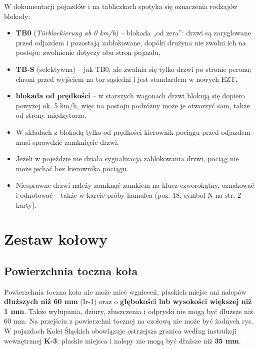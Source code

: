 W dokumentacji pojazdów i na tabliczkach spotyka się oznaczenia rodzajów blokady:
\begin{itemize}
	\item \textbf{TB0} (\textit{Türblockierung ab 0 km/h}) – blokada „od zera”: drzwi są zaryglowane przed odjazdem i pozostają zablokowane, dopóki drużyna nie zwolni ich na postoju; zwolnienie dotyczy obu stron pojazdu,
	\item \textbf{TB-S} (selektywna) – jak TB0, ale zwalnia się tylko drzwi po stronie peronu; chroni przed wyjściem na tor sąsiedni i jest standardem w nowych EZT,
	\item \textbf{blokada od prędkości} – w starszych wagonach drzwi blokują się dopiero powyżej ok. 5 km/h, więc na postoju podróżny może je otworzyć sam, także od strony międzytorza.
\end{itemize}

\begin{tcolorbox}[colback=yellow!10!white,colframe=orange!80!black,title=Dla kierownika pociągu]
	\begin{itemize}
		\item W składach z blokadą tylko od prędkości kierownik pociągu przed odjazdem musi sprawdzić zamknięcie drzwi.
		\item Jeżeli w pojeździe nie działa sygnalizacja zablokowania drzwi, pociąg nie może jechać bez kierownika pociągu.
		\item Niesprawne drzwi należy zamknąć zamkiem na klucz czworokątny, oznakować i odnotować – także w karcie próby hamulca (poz. 18, symbol N na str. 2 karty).
	\end{itemize}
\end{tcolorbox}

\section{Zestaw kołowy}

\subsection*{Powierzchnia toczna koła}

Powierzchnia toczna koła nie może mieć wgnieceń, płaskich miejsc ani nalepów \textbf{dłuższych niż 60 mm} (Ir-1) oraz o \textbf{głębokości lub wysokości większej niż 1 mm}. Także wyłupania, dziury, złuszczenia i odpryski nie mogą być dłuższe niż 60 mm. Na przejściu z powierzchni tocznej na czołową nie może być żadnych rys. W pojazdach Kolei Śląskich obowiązuje ostrzejsza granica według instrukcji wewnętrznej \textbf{K-3}: płaskie miejsca i nalepy nie mogą być dłuższe niż \textbf{35 mm}.

